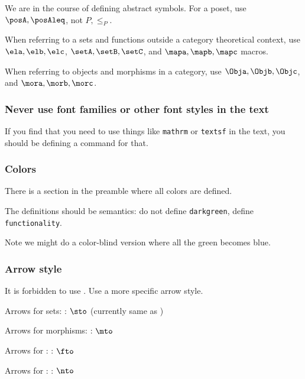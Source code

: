 We are in the course of defining abstract symbols.
For a poset, use $\posA,\posAleq$, not $P,\leq_P$.

When referring to a sets and functions outside a category theoretical context,   use $\ela,\elb,\elc$, $\setA,\setB,\setC$, and $\mapa,\mapb,\mapc$ macros.

When referring to objects and morphisms in a category,   use $\Obja,\Objb,\Objc$, and $\mora,\morb,\morc$.

\subsubsection*{Never use font families or other font styles in the text}

If you find that you need to use things like \texttt{mathrm} or \texttt{textsf} in the text, you should be defining a command for that.

\subsubsection*{Colors}

There is a section in the preamble where all colors are defined.

The definitions should be semantics: do not define \texttt{darkgreen}, define \texttt{fun\-ctionality}.

Note we might do a color-blind version where all the green becomes blue.

\subsubsection*{Arrow style}

It is forbidden to use \str{\to}.
Use a more specific arrow style.

Arrows for sets: \str{\sto}: $\sto$ (currently same as )

Arrows for morphisms: \str{\mto}: $\mto$

Arrows for : \str{\fto}: $\fto$

Arrows for : \str{\nto}: $\nto$

%
%
%
%

